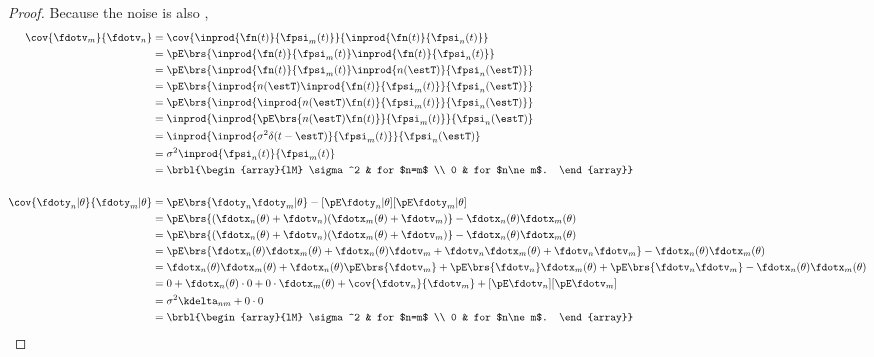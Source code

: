 \begin{proposition}
\begin{proof}
Because the noise is also ,
\begin{align*}
   \cov{\fdotv_m}{\fdotv_n}
      &= \cov{\inprod{\fn(t)}{\fpsi_m(t)}}{\inprod{\fn(t)}{\fpsi_n(t)}}
    \\&= \pE\brs{\inprod{\fn(t)}{\fpsi_m(t)} \inprod{\fn(t)}{\fpsi_n(t)}}
    \\&= \pE\brs{\inprod{\fn(t)}{\fpsi_m(t)} \inprod{n(\estT)}{\fpsi_n(\estT)}}
    \\&= \pE\brs{ \inprod{n(\estT)\inprod{\fn(t)}{\fpsi_m(t)}}{\fpsi_n(\estT)}}
    \\&= \pE\brs{ \inprod{\inprod{n(\estT)\fn(t)}{\fpsi_m(t)}}{\fpsi_n(\estT)}}
    \\&= \inprod{\inprod{\pE\brs{ n(\estT)\fn(t)}}{\fpsi_m(t)}}{\fpsi_n(\estT)}
    \\&= \inprod{\inprod{\sigma^2 \delta(t-\estT)}{\fpsi_m(t)}}{\fpsi_n(\estT)}
    \\&= \sigma^2 \inprod{\fpsi_n(t)}{\fpsi_m(t)}
    \\&= \brbl{\begin{array}{lM}
             \sigma^2 & for $n=m$ \\
             0        & for $n\ne m$.
          \end{array}}
\\
\\
   \cov{\fdoty_n|\theta}{\fdoty_m|\theta }
      &= \pE\brs{\fdoty_n \fdoty_m |\theta} - [\pE\fdoty_n|\theta][\pE\fdoty_m|\theta ]
    \\&= \pE\brs{(\fdotx_n(\theta) +\fdotv_n)(\fdotx_m(\theta) +\fdotv_m)} - \fdotx_n(\theta) \fdotx_m(\theta)
    \\&= \pE\brs{(\fdotx_n(\theta) +\fdotv_n)(\fdotx_m(\theta) +\fdotv_m)} - \fdotx_n(\theta) \fdotx_m(\theta)
    \\&= \pE\brs{\fdotx_n(\theta) \fdotx_m(\theta) +\fdotx_n(\theta) \fdotv_m+ \fdotv_n\fdotx_m(\theta) +\fdotv_n\fdotv_m } - \fdotx_n(\theta) \fdotx_m(\theta)
    \\&= \fdotx_n(\theta) \fdotx_m(\theta) + \fdotx_n(\theta) \pE\brs{\fdotv_m}+ \pE\brs{\fdotv_n}\fdotx_m(\theta) +\pE\brs{\fdotv_n\fdotv_m}  - \fdotx_n(\theta) \fdotx_m(\theta)
    \\&= 0 + \fdotx_n(\theta) \cdot0 + 0\cdot\fdotx_m(\theta) + \cov{\fdotv_n}{\fdotv_m}+[\pE\fdotv_n][\pE\fdotv_m]
    \\&= \sigma^2 \kdelta_{nm} + 0\cdot0
    \\&= \brbl{\begin{array}{lM}
             \sigma^2 & for $n=m$ \\
             0        & for $n\ne m$.
          \end{array}}
\end{align*}
\end{proof}



\end{proposition}

